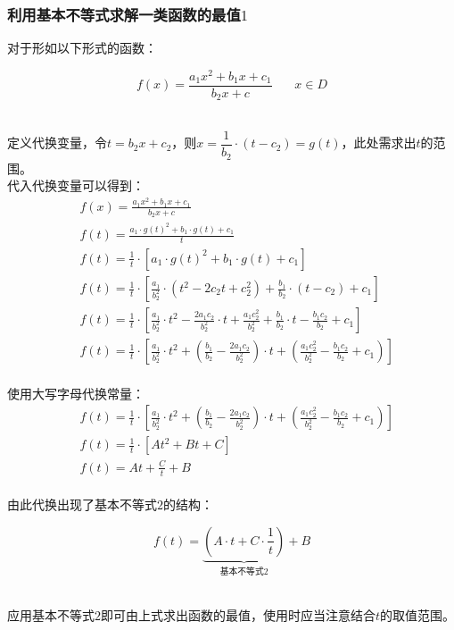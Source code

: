 \documentclass[UTF8]{ctexart}
\begin{document}
\newpage

\subsubsection{利用基本不等式求解一类函数的最值$1$}
    \setcounter{equation}{0}
    对于形如以下形式的函数：
    \begin{large}
        \begin{equation*}
            f(x)=\frac{a_1x^2+b_1x+c_1}{b_2x+c}~~~~~~~~x\in D
        \end{equation*}
    \end{large}\\
    定义代换变量，令$t=b_2x+c_2$，则$x=\dfrac{1}{b_2}\cdot(t-c_2)=g(t)$，此处需求出$t$的范围。\\[3mm]
    代入代换变量可以得到：
    \begin{align}
        &f(x)=\frac{a_1x^2+b_1x+c_1}{b_2x+c}\\[6mm]
        &f(t)=\frac{a_1\cdot g(t)^2+b_1\cdot g(t)+c_1}{t}\\[6mm]
        &f(t)=\frac{1}{t}\cdot\left[a_1\cdot g(t)^2+b_1\cdot g(t)+c_1\right]\\[6mm]
        &f(t)=\frac{1}{t}\cdot\left[\frac{a_1}{b_2^2}\cdot(t^2-2c_2t+c_2^2)+\frac{b_1}{b_2}\cdot(t-c_2)+c_1\right]\\[6mm]
        &f(t)=\frac{1}{t}\cdot\left[\frac{a_1}{b_2^2}\cdot t^2-\frac{2a_1c_2}{b_2^2}\cdot t+\frac{a_1c_2^2}{b_2^2}+\frac{b_1}{b_2}\cdot t-\frac{b_1c_2}{b_2}+c_1\right]\\[6mm]
        &f(t)=\frac{1}{t}\cdot\left[\frac{a_1}{b_2^2}\cdot t^2+\left(\frac{b_1}{b_2}-\frac{2a_1c_2}{b_2^2}\right)\cdot t+\left(\frac{a_1c_2^2}{b_2^2}-\frac{b_1c_2}{b_2}+c_1\right)\right]
    \end{align}\\
    使用大写字母代换常量：
    \begin{align}
        &f(t)=\frac{1}{t}\cdot\left[\frac{a_1}{b_2^2}\cdot t^2+\left(\frac{b_1}{b_2}-\frac{2a_1c_2}{b_2^2}\right)\cdot t+\left(\frac{a_1c_2^2}{b_2^2}-\frac{b_1c_2}{b_2}+c_1\right)\right]\\[6mm]
        &f(t)=\frac{1}{t}\cdot\left[At^2+Bt+C\right]\\[6mm]
        &f(t)=At+\frac{C}{t}+B
    \end{align}\\
    由此代换出现了基本不等式$2$的结构：
    \begin{large}
        \begin{equation*}
            f(t)=\underbrace{\left(A\cdot t+C\cdot\frac{1}{t}\right)}_{\text{基本不等式2}}+B
        \end{equation*}
    \end{large}\\
    应用基本不等式$2$即可由上式求出函数的最值，使用时应当注意结合$t$的取值范围。
\end{document}

